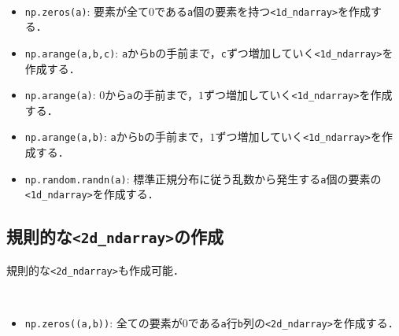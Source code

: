 \begin{gram}　
\begin{itemize}
\item \texttt{np.zeros(a)}: 要素が全て0である\texttt{a}個の要素を持つ\texttt{<1d\_ndarray>}を作成する．
\item \texttt{np.arange(a,b,c)}: \texttt{a}から\texttt{b}の手前まで，\texttt{c}ずつ増加していく\texttt{<1d\_ndarray>}を作成する．
\item \texttt{np.arange(a)}: $0$から\texttt{a}の手前まで，$1$ずつ増加していく\texttt{<1d\_ndarray>}を作成する．
\item \texttt{np.arange(a,b)}: \texttt{a}から\texttt{b}の手前まで，$1$ずつ増加していく\texttt{<1d\_ndarray>}を作成する．
\item \texttt{np.random.randn(a)}: 標準正規分布に従う乱数から発生する\texttt{a}個の要素の\texttt{<1d\_ndarray>}を作成する．
\end{itemize}
\end{gram}

\begin{cod}[\texttt{num2.py}]　
}]{code/num2.py}
\vspace{-10pt}
\begin{lstlisting}
v=[0. 0. 0. 0. 0.]
w=[ 0  2  4  6  8 10 12 14 16 18 20 22 24 26 28]
x=[0 1 2 3 4 5 6 7 8 9]
y=[-10  -9  -8  -7  -6  -5  -4  -3  -2  -1   0]
z=[-0.38558831  1.20391439  1.18496279  1.50358118  0.93103295 -0.02233168
  0.04894498  0.20757944 -2.67874618 -1.90888007]
\end{lstlisting}
\end{cod}
\vspace{-10pt}

\subsection{規則的な\texttt{<2d\_ndarray>}の作成}

規則的な\texttt{<2d\_ndarray>}も作成可能．
\begin{gram}　
\begin{itemize}
\item \texttt{np.zeros((a,b))}: 全ての要素が0である\texttt{a}行\texttt{b}列の\texttt{<2d\_ndarray>}を作成する．
\end{itemize}
\end{gram}

\begin{cod}[\texttt{num7.py}]　
}]{code/num7.py}
\vspace{-10pt}
\begin{lstlisting}
A=
[[0. 0. 0.]
 [0. 0. 0.]
 [0. 0. 0.]
 [0. 0. 0.]]
shape=(4, 3)
\end{lstlisting}
\end{cod}
\vspace{-10pt}

